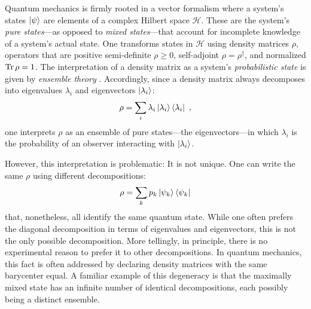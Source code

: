 \documentclass[draft,nofootinbib,prl,twocolumn,showpacs,showkeys,groupaddress,preprintnumbers,floatfix]{revtex4-1}
\newcommand{\1}{\mathbbm{1}}
\begin{document}

\date{\today}
\maketitle





Quantum mechanics is firmly rooted in a vector formalism where a system's
states $\ket{\psi}$ are elements of a complex Hilbert space $\mathcal{H}$.
These are the system's \emph{pure states}---as opposed to \emph{mixed
states}---that account for incomplete knowledge of a system's actual state. One
transforms states in $\mathcal{H}$ using density matrices $\rho$, operators
that are positive semi-definite $\rho \geq 0$, self-adjoint $\rho =
\rho^\dagger$, and normalized $\Tr \rho = 1$. The interpretation of a density
matrix as a system's \emph{probabilistic state} is given by \emph{ensemble
theory} \cite{Pathria2011,Greiner1995}. Accordingly, since a density matrix
always decomposes into eigenvalues $\lambda_i$ and eigenvectors
$\ket{\lambda_i}$:
\begin{align*}
\rho = \sum_i \lambda_i \ket{\lambda_i}\bra{\lambda_i}
  ~,
\end{align*}
one interprets $\rho$ as an ensemble of pure states---the eigenvectors---in
which $\lambda_i$ is the probability of an observer interacting with
$\ket{\lambda_i}$.

However, this interpretation is problematic: It is not unique. One can write
the same $\rho$ using different decompositions:
\begin{align*}
\rho = \sum_k p_k \ket{\psi_k}\bra{\psi_k}
\end{align*}
that, nonetheless, all identify the same quantum state. While one often prefers
the diagonal decomposition in terms of eigenvalues and eigenvectors, this is
not the only possible decomposition. More tellingly, in principle, there is no
experimental reason to prefer it to other decompositions. In quantum mechanics,
this fact is often addressed by declaring density matrices with the same
barycenter equal. A familiar example of this degeneracy is that the maximally
mixed state has an infinite number of identical decompositions, each possibly
being a distinct ensemble.
\end{document}
